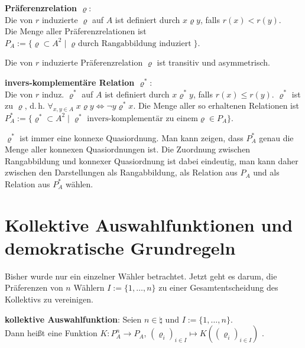 \textbf{Präferenzrelation $\varrho$}:\\
Die von $r$ induzierte  $\varrho$ auf $A$
ist definiert durch $x\varrho y$, falls $r(x) < r(y)$.\\
Die Menge aller Präferenzrelationen ist
$P_A := \{\varrho \subset A^2 \;|\; \text{$\varrho$ durch Rangabbildung induziert}\}$.

Die von $r$ induzierte Präferenzrelation $\varrho$ ist transitiv und asymmetrisch.

\linie

\textbf{invers-komplementäre Relation $\varrho^\ast$}:\\
Die von $r$ induz.  $\varrho^\ast$ auf $A$
ist definiert durch $x\varrho^\ast y$, falls $r(x) \le r(y)$.
$\varrho^\ast$ ist  zu $\varrho$, d.\,h.
$\forall_{x, y \in A}\; x\varrho y \iff \lnot y\varrho^\ast x$.
Die Menge aller so erhaltenen Relationen ist
$P_A^\ast := \{\varrho^\ast \subset A^2 \;|\; \text{$\varrho^\ast$ invers-komplementär zu einem
$\varrho \in P_A$}\}$.

$\varrho^\ast$ ist immer eine konnexe Quasiordnung.
Man kann zeigen, dass $P_A^\ast$ genau die Menge aller konnexen Quasiordnungen ist.
Die Zuordnung zwischen Rangabbildung und konnexer Quasiordnung ist dabei eindeutig,
man kann daher zwischen den Darstellungen als Rangabbildung, als Relation aus $P_A$ und als
Relation aus $P_A^\ast$ wählen.

\pagebreak

\section{%
    Kollektive Auswahlfunktionen und demokratische Grundregeln%
}

Bisher wurde nur ein einzelner Wähler betrachtet.
Jetzt geht es darum, die Präferenzen von $n$ Wählern
$I := \{1, \dotsc, n\}$ zu einer Gesamtentscheidung des Kollektivs zu vereinigen.

\textbf{kollektive Auswahlfunktion}:
Seien $n \in \natural$ und $I := \{1, \dotsc, n\}$.\\
Dann heißt eine Funktion $K\colon P_A^n \to P_A$,
$(\varrho_i)_{i \in I} \mapsto K((\varrho_i)_{i \in I})$ .

